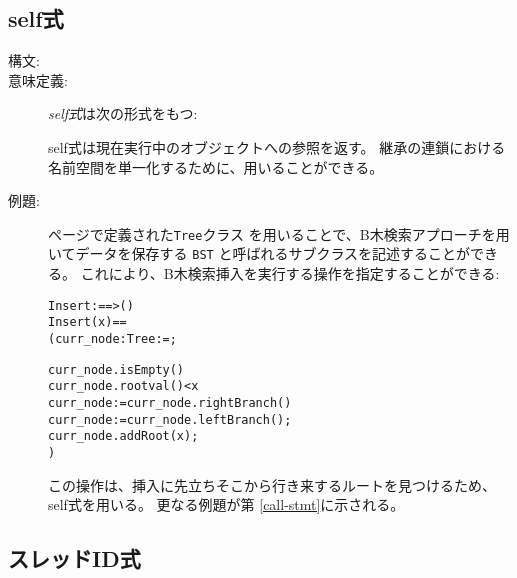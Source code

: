 \documentclass[\pformat,12pt]{jarticle}
\begin{document}
\subsection{self式}
\label{sec:self}

\begin{description}
\item[構文:] 

\item[意味定義:] {\it self式}は次の形式をもつ:

  \begin{alltt}
  \end{alltt}
  self式は現在実行中のオブジェクトへの参照を返す。
継承の連鎖における名前空間を単一化するために、用いることができる。

\item[例題:] \pageref{TreeDef} ページで定義された\texttt{Tree}クラス を用いることで、B木検索アプローチを用いてデータを保存する \texttt{BST} と呼ばれるサブクラスを記述することができる。
これにより、B木検索挿入を実行する操作を指定することができる:
\begin{alltt}
    Insert :  ==> ()
    Insert (x) ==
      ( curr_node : Tree := ;

        curr_node.isEmpty() 
          curr_node.rootval() < x
          curr_node := curr_node.rightBranch()
          curr_node := curr_node.leftBranch();
       curr_node.addRoot(x);
       )
\end{alltt}
この操作は、挿入に先立ちそこから行き来するルートを見つけるため、self式を用いる。 
更なる例題が第 \ref{call-stmt}に示される。
\end{description}

\subsection{スレッドID式}
\label{sec:threadid}
\end{document}
